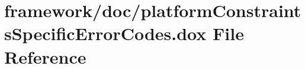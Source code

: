 \hypertarget{platform_constraints_specific_error_codes_8dox}{}\section{framework/doc/platform\+Constraints\+Specific\+Error\+Codes.dox File Reference}
\label{platform_constraints_specific_error_codes_8dox}
